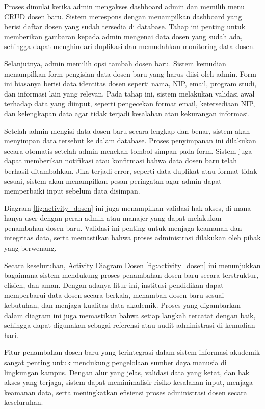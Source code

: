 \documentclass[a4paper,oneside,11pt]{book}
\begin{document}
Proses dimulai ketika admin mengakses dashboard admin dan memilih menu CRUD dosen baru. Sistem merespons dengan menampilkan dashboard yang berisi daftar dosen yang sudah tersedia di database. Tahap ini penting untuk memberikan gambaran kepada admin mengenai data dosen yang sudah ada, sehingga dapat menghindari duplikasi dan memudahkan monitoring data dosen.

Selanjutnya, admin memilih opsi tambah dosen baru. Sistem kemudian menampilkan form pengisian data dosen baru yang harus diisi oleh admin. Form ini biasanya berisi data identitas dosen seperti nama, NIP, email, program studi, dan informasi lain yang relevan. Pada tahap ini, sistem melakukan validasi awal terhadap data yang diinput, seperti pengecekan format email, ketersediaan NIP, dan kelengkapan data agar tidak terjadi kesalahan atau kekurangan informasi.

Setelah admin mengisi data dosen baru secara lengkap dan benar, sistem akan menyimpan data tersebut ke dalam database. Proses penyimpanan ini dilakukan secara otomatis setelah admin menekan tombol simpan pada form. Sistem juga dapat memberikan notifikasi atau konfirmasi bahwa data dosen baru telah berhasil ditambahkan. Jika terjadi error, seperti data duplikat atau format tidak sesuai, sistem akan menampilkan pesan peringatan agar admin dapat memperbaiki input sebelum data disimpan.

Diagram \ref{fig:activity_dosen} ini juga menampilkan validasi hak akses, di mana hanya user dengan peran admin atau manajer yang dapat melakukan penambahan dosen baru. Validasi ini penting untuk menjaga keamanan dan integritas data, serta memastikan bahwa proses administrasi dilakukan oleh pihak yang berwenang.

Secara keseluruhan, Activity Diagram Dosen \ref{fig:activity_dosen} ini menunjukkan bagaimana sistem mendukung proses penambahan dosen baru secara terstruktur, efisien, dan aman. Dengan adanya fitur ini, institusi pendidikan dapat memperbarui data dosen secara berkala, menambah dosen baru sesuai kebutuhan, dan menjaga kualitas data akademik. Proses yang digambarkan dalam diagram ini juga memastikan bahwa setiap langkah tercatat dengan baik, sehingga dapat digunakan sebagai referensi atau audit administrasi di kemudian hari.

Fitur penambahan dosen baru yang terintegrasi dalam sistem informasi akademik sangat penting untuk mendukung pengelolaan sumber daya manusia di lingkungan kampus. Dengan alur yang jelas, validasi data yang ketat, dan hak akses yang terjaga, sistem dapat meminimalisir risiko kesalahan input, menjaga keamanan data, serta meningkatkan efisiensi proses administrasi dosen secara keseluruhan.
\end{document}
